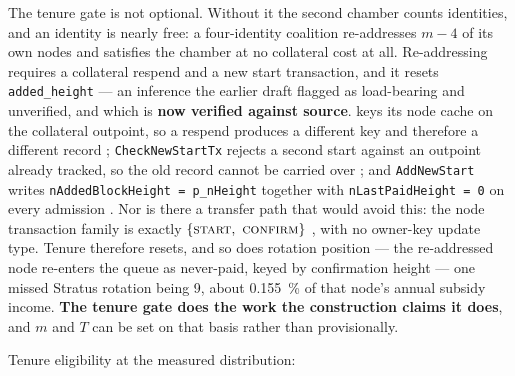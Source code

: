 The tenure gate is not optional. Without it the second chamber counts identities, and an identity is
nearly free: a four-identity coalition re-addresses $m-4$ of its own nodes and satisfies the chamber
at no collateral cost at all. Re-addressing requires a collateral respend and a new start
transaction, and it resets \texttt{added\_height} --- an inference the earlier draft flagged as
load-bearing and unverified, and which is \textbf{now verified against source}. \fluxd{} keys its
node cache on the collateral outpoint, so a respend produces a different key and therefore a
different record \shipped
{};
\texttt{Check\allowbreak{}New\allowbreak{}Start\allowbreak{}Tx} rejects a second start against an outpoint
already tracked, so the old record cannot be carried over \shipped
{}; and
\texttt{Add\allowbreak{}New\allowbreak{}Start} writes \texttt{nAddedBlockHeight = p\_nHeight} together
with \texttt{nLastPaidHeight = 0} on every admission \shipped
{}. Nor is there a
transfer path that would avoid this: the node transaction family is exactly
$\{\textsc{start},\ \textsc{confirm}\}$ \shipped
{}, with no
owner-key update type. Tenure therefore resets, and so does rotation position --- the re-addressed
node re-enters the queue as never-paid, keyed by confirmation height \shipped
{} --- one missed
Stratus rotation being \num{9}\flux, about \SI{0.155}{\percent} of that node's annual subsidy income.
\textbf{The tenure gate does the work the construction claims it does}, and $m$ and $T$ can be set on
that basis rather than provisionally.

Tenure eligibility at the measured distribution:

